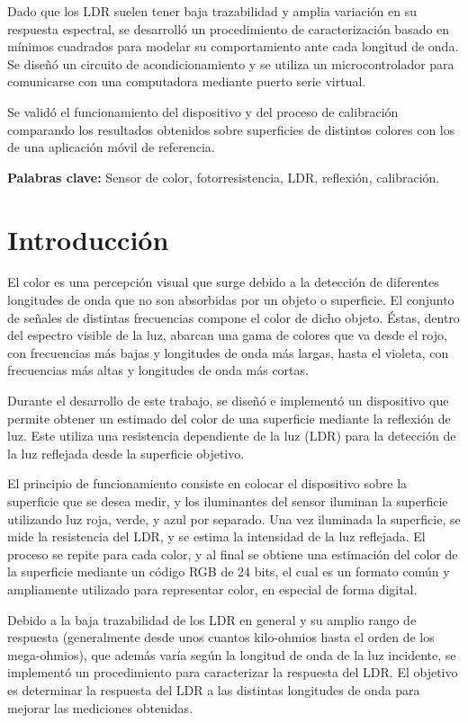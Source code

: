 \documentclass[12pt,a4paper,fleqn]{article}
\begin{document}
Dado que los LDR suelen tener baja trazabilidad y amplia variación en su respuesta espectral, se desarrolló un procedimiento de caracterización basado en mínimos cuadrados para modelar su comportamiento ante cada longitud de onda. Se diseñó un circuito de acondicionamiento y se utiliza un microcontrolador para comunicarse con una computadora mediante puerto serie virtual.

Se validó el funcionamiento del dispositivo y del proceso de calibración comparando los resultados obtenidos sobre superficies de distintos colores con los de una aplicación móvil de referencia. 

\noindent\textbf{Palabras clave:} Sensor de color, fotorresistencia, LDR, reflexión, calibración.


\section{Introducción}

El color es una percepción visual que surge debido a la detección de diferentes longitudes de onda que no son absorbidas por un objeto o superficie. El conjunto de señales de distintas frecuencias compone el color de dicho objeto. Éstas, dentro del espectro visible de la luz, abarcan una gama de colores que va desde el rojo, con frecuencias más bajas y longitudes de onda más largas, hasta el violeta, con frecuencias más altas y longitudes de onda más cortas.

Durante el desarrollo de este trabajo, se diseñó e implementó un dispositivo que permite obtener un estimado del color de una superficie mediante la reflexión de luz. Este utiliza una resistencia dependiente de la luz (LDR) para la detección de la luz reflejada desde la superficie objetivo.

El principio de funcionamiento consiste en colocar el dispositivo sobre la superficie que se desea medir, y los iluminantes del sensor iluminan la superficie utilizando luz roja, verde, y azul por separado. Una vez iluminada la superficie, se mide la resistencia del LDR, y se estima la intensidad de la luz reflejada. El proceso se repite para cada color, y al final se obtiene una estimación del color de la superficie mediante un código RGB de 24 bits, el cual es un formato común y ampliamente utilizado para representar color, en especial de forma digital.

Debido a la baja trazabilidad de los LDR en general y su amplio rango de respuesta (generalmente desde unos cuantos kilo-ohmios hasta el orden de los mega-ohmios), que además varía según la longitud de onda de la luz incidente, se implementó un procedimiento para caracterizar la respuesta del LDR. El objetivo es determinar la respuesta del LDR a las distintas longitudes de onda para mejorar las mediciones obtenidas.
\end{document}
